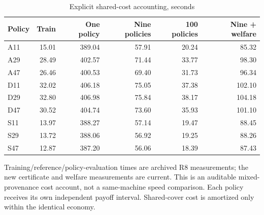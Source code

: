 \begin{table}[htbp]
\centering\small\setlength{\tabcolsep}{4pt}
\caption{Explicit shared-cost accounting, seconds}\label{tab:r9cost}
\begin{tabular}{lrrrrr}
\toprule
Policy & Train & One policy & Nine policies & 100 policies & Nine + welfare \\
\midrule
A11 & 15.01 & 389.04 & 57.91 & 20.24 & 85.32 \\
A29 & 28.49 & 402.57 & 71.44 & 33.77 & 98.30 \\
A47 & 26.46 & 400.53 & 69.40 & 31.73 & 96.34 \\
D11 & 32.02 & 406.18 & 75.05 & 37.38 & 102.10 \\
D29 & 32.80 & 406.98 & 75.84 & 38.17 & 104.18 \\
D47 & 30.52 & 404.74 & 73.60 & 35.93 & 101.10 \\
S11 & 13.97 & 388.27 & 57.14 & 19.47 & 88.45 \\
S29 & 13.72 & 388.06 & 56.92 & 19.25 & 88.26 \\
S47 & 12.87 & 387.20 & 56.06 & 18.39 & 87.43 \\
\bottomrule
\end{tabular}
\par\vspace{3pt}\begin{minipage}{0.97\linewidth}\footnotesize Training/reference/policy-evaluation times are archived R8 measurements; the new certificate and welfare measurements are current. This is an auditable mixed-provenance cost account, not a same-machine speed comparison. Each policy receives its own independent payoff interval. Shared-cover cost is amortized only within the identical economy.\end{minipage}
\end{table}
